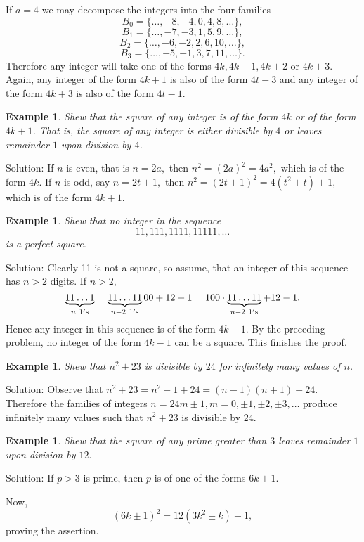 \documentclass[11pt, openany]{book}
\theoremstyle{change} \theoremheaderfont{\blue\sffamily\bfseries}
\newtheorem{exa}[thm]{Example}
\theoremstyle{nonumberplain} \theoremheaderfont{\sffamily\bfseries}
\newcommand{\í}{\'{\i}}
\begin{document}
If $a = 4$ we may decompose the integers into the four families
$$B_0 = \{\ldots , -8, -4, 0, 4, 8, \ldots \},$$
$$B_1 = \{  \ldots , -7, -3, 1, 5, 9, \ldots \},$$
$$B_2 = \{  \ldots , -6, -2, 2, 6, 10, \ldots \},$$
$$B_3 = \{  \ldots , -5, -1, 3, 7, 11, \ldots \}.$$
Therefore any integer will take one of the forms $4k, 4k + 1, 4k +
2$ or $4k + 3.$ Again, any integer of the form $4k + 1$ is also of
the form $4t - 3$ and any integer of the form  $4k + 3$ is also of
the form $4t - 1$.


\begin{exa} Shew that the square of any integer is of the form $4k$ or of the form
$4k + 1$. That is, the square of any integer is either divisible
by $4$ or leaves remainder $1$ upon division by $4$.\end{exa}
Solution: If $n$ is even, that is $ n = 2a,$ then $n^2 =(2a)^2
=4a^2,$ which is of the form $4k.$ If $n$ is odd, say $n = 2t +
1,$ then  $n^2 = (2t + 1)^2 = 4(t^2 + t) + 1,$ which is of the
form $4k + 1$.
\begin{exa} Shew that no integer in the sequence
$$11, 111, 1111, 11111, \ldots$$ is a perfect square.
\end{exa}
Solution: Clearly 11 is not a square, so assume,  that an integer
of this sequence has
 $n > 2$ digits. If $n > 2$,
$$\underbrace{11\ldots 1}_{n \ 1{\rm 's}} = \underbrace{11\ldots 11}_{n - 2 \ 1{\rm 's}}00 + 12 - 1
= 100 \cdot \underbrace{11\ldots 11}_{n - 2 \ 1{\rm 's}} + 12 - 1.
$$ Hence any integer in this sequence is of the form  $4k - 1$. By
the preceding problem, no integer of the form $4k - 1$ can be a
square. This finishes the proof.
\begin{exa} Shew that $n^2 + 23$ is divisible by  $24$ for infinitely many values of  $n$.
\end{exa}
Solution: Observe that $n^2 + 23 = n^2 - 1 + 24 = (n - 1)(n + 1) +
24$. Therefore the families of integers $n = 24m \pm 1, m = 0, \pm
1, \pm 2, \pm 3, \ldots$ produce infinitely many values such that
$n^2 + 23$ is divisible by 24.
\begin{exa} Shew that the square of any prime greater than $3$ leaves remainder
$1$ upon division by $12.$\end{exa} Solution: If $p > 3$ is prime,
then $p$ is of one of the forms $6k \pm 1$.



Now,
$$(6k \pm 1)^2 = 12(3k^2 \pm k) + 1,$$
proving the assertion.
\end{document}
